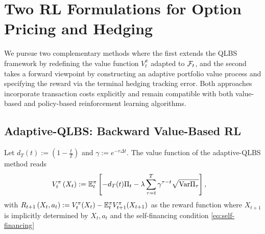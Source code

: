 \section{Two RL Formulations for Option Pricing and Hedging}
\label{method}


We pursue two complementary methods where
the first extends the QLBS framework by redefining the value function $V_t^\pi$ adapted to ${\mathcal{F}_t}$,
and the second takes a forward viewpoint by constructing an adaptive portfolio value process and specifying the reward via the terminal hedging tracking error.
Both approaches incorporate transaction costs explicitly and remain compatible with both value-based and policy-based reinforcement learning algorithms.


\subsection{Adaptive-QLBS: Backward Value-Based RL}

\begin{defn}
\label{def:qlbs}
Let $d_T(t):=\left(1-\frac{t}{T}\right)$ and $\gamma:=e^{-r \Delta t}$.
The value function of the adaptive-QLBS method reads
{\small%
\begin{align}
V_{t}^{\pi}\left(X_{t}\right)&:=\mathbb{E}_{t}^{\pi}\left[-d_T(t)\Pi_{t}-\lambda\sum_{\tau=t}^{T}\gamma^{\tau-t}\sqrt{\text{Var}\Pi_{\tau}}\right],\label{eq:qlbs-modified-V}
\end{align}
}with $R_{t+1}\left(X_{t},a_{t}\right):=V_t^\pi(X_t)-\mathbb{E}_{t}^{\pi} V_{t+1}^\pi(X_{t+1})$ as the reward function where $X_{t+1}$ is implicitly determined by $X_t,a_t$ and the self-financing condition \cref{eq:self-financing}
\end{defn}

